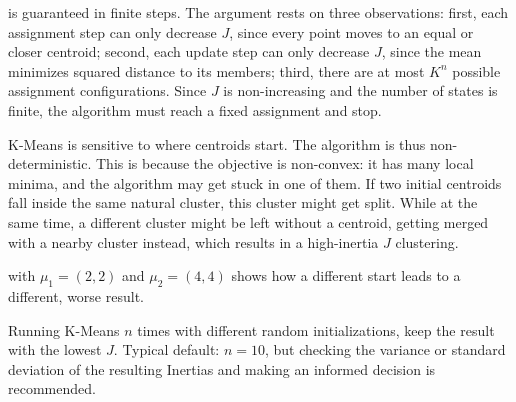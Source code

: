
 is guaranteed in finite steps.
The argument rests on three observations:
first, each assignment step can only decrease $J$, since every point moves to an equal or closer centroid;
second, each update step can only decrease $J$, since the mean minimizes squared distance to its members;
third, there are at most $K^n$ possible assignment configurations.
Since $J$ is non-increasing and the number of states is finite, the algorithm must reach a fixed assignment and stop.




\vspace{0.5em}


K-Means is sensitive to where centroids start. The algorithm is thus non-deterministic.
This is because the objective is non-convex: it has many local minima, and the algorithm may get stuck in one of them.
If two initial centroids fall inside the same natural cluster, this cluster might get split. While at the same time, 
a different cluster might be left without a centroid, getting merged with a nearby cluster instead, 
which results in a high-inertia $J$ clustering.

 with $\mu_1{=}(2,2)$ and $\mu_2{=}(4,4)$ shows how a different 
start leads to a different, worse result.

 Running K-Means $n$ times with different random initializations, 
keep the result with the lowest $J$. Typical default: $n{=}10$, but checking the variance or standard deviation of the 
resulting Inertias and making an informed decision is recommended. 


